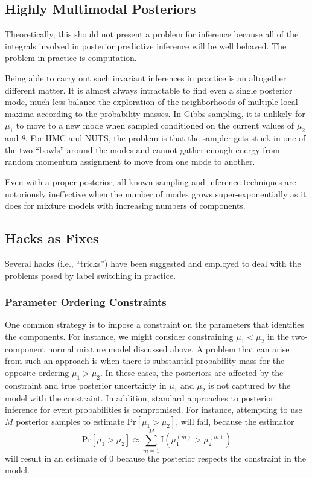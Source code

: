 \subsection{Highly Multimodal Posteriors}

Theoretically, this should not present a problem for inference because
all of the integrals involved in posterior predictive inference will
be well behaved. The problem in practice is computation. 

Being able to carry out such invariant inferences in practice is an
altogether different matter.  It is almost always intractable to find
even a single posterior mode, much less balance the exploration of the
neighborhoods of multiple local maxima according to the probability
masses. In Gibbs sampling, it is unlikely for $\mu_1$
to move to a new mode when sampled conditioned on the current values
of $\mu_2$ and $\theta$. For HMC and NUTS, the problem is that the
sampler gets stuck in one of the two ``bowls'' around the modes and
cannot gather enough energy from random momentum assignment to move
from one mode to another.

Even with a proper posterior, all known sampling and inference
techniques are notoriously ineffective when the number of modes grows
super-exponentially as it does for mixture models with increasing
numbers of components.

\subsection{Hacks as Fixes}

Several hacks (i.e., ``tricks'') have been suggested and employed to
deal with the problems posed by label switching in practice.

\subsubsection{Parameter Ordering Constraints}

One common strategy is to impose a constraint on the parameters that
identifies the components.  For instance, we might consider
constraining $\mu_1 < \mu_2$ in the two-component normal mixture model
discussed above.  A problem that can arise from such an approach is
when there is substantial probability mass for the opposite ordering
$\mu_1 > \mu_2$.  In these cases, the posteriors are affected by
the constraint and true posterior uncertainty in $\mu_1$ and $\mu_2$
is not captured by the model with the constraint.  In addition,
standard approaches to posterior inference for event probabilities is
compromised.  For instance, attempting to use $M$ posterior samples to
estimate $\mbox{Pr}[\mu_1 > \mu_2]$, will fail, because the estimator
\[
\mbox{Pr}[\mu_1 > \mu_2] 
\approx 
\sum_{m=1}^M \mbox{I}(\mu_1^{(m)} > \mu_2^{(m)})
\]
will result in an estimate of 0 because the posterior respects the
constraint in the model.  

